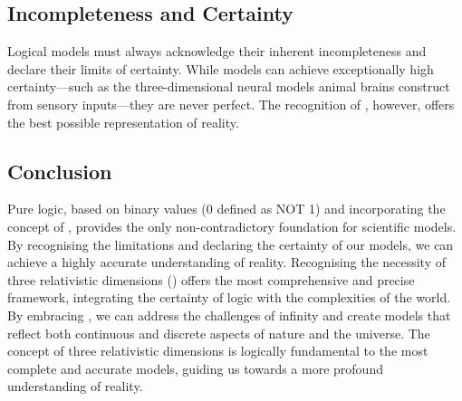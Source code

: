 \documentclass{article}
\begin{document}
\subsection*{Incompleteness and Certainty}

Logical models must always acknowledge their inherent incompleteness and declare their limits of certainty. While models can achieve exceptionally high certainty—such as the three-dimensional neural models animal brains construct from sensory inputs—they are never perfect. The recognition of \iR{}, however, offers the best possible representation of reality.

\subsection*{Conclusion}

Pure logic, based on binary values (0 defined as NOT 1) and incorporating the concept of \qbit{}, provides the only non-contradictory foundation for scientific models. By recognising the limitations and declaring the certainty of our models, we can achieve a highly accurate understanding of reality. Recognising the necessity of three relativistic dimensions (\iR{}) offers the most comprehensive and precise framework, integrating the certainty of logic with the complexities of the world. By embracing \qbit{}, we can address the challenges of infinity and create models that reflect both continuous and discrete aspects of nature and the universe. The concept of three relativistic dimensions is logically fundamental to the most complete and accurate models, guiding us towards a more profound understanding of reality.
\end{document}

